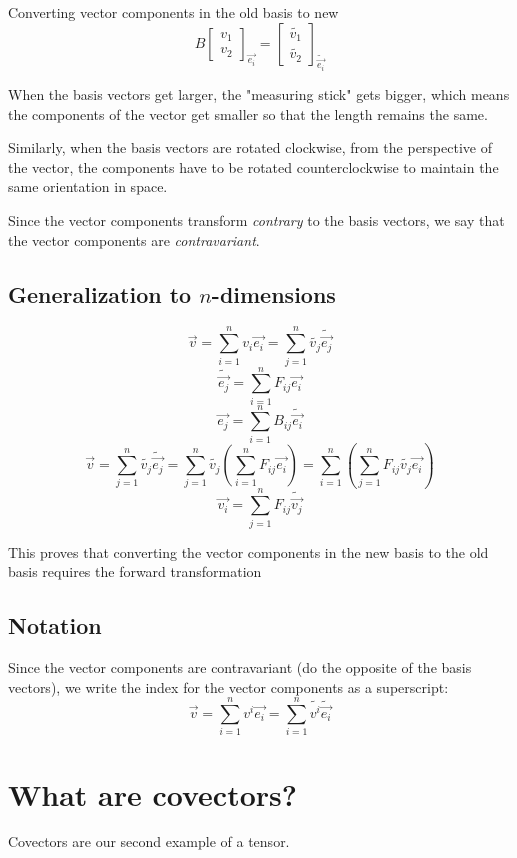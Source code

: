 \documentclass{report}
\begin{document}
Converting vector components in the old basis to new
$$ B\begin{bmatrix} v_1 \\ v_2 \end{bmatrix}_{\vec{e_i}} = \begin{bmatrix} \tilde{v_1} \\ \tilde{v_2} \end{bmatrix}_{\tilde{\vec{e_i}}}   $$ 

When the basis vectors get larger, the "measuring stick" gets bigger, which means the components of the vector get smaller so that the length remains the same.

Similarly, when the basis vectors are rotated clockwise, from the perspective of the vector, the components have to be rotated counterclockwise to maintain the same orientation in space.

Since the vector components transform \emph{contrary} to the basis vectors, we say that the vector components are \emph{contravariant}.

\section{Generalization to $n$-dimensions}
\begin{myproof}
	$$ \vec{v} = \sum_{i=1}^{n} v_i \vec{e_i} = \sum_{j=1}^{n} \tilde{v_j}\tilde{\vec{e_j}}$$
	$$ \widetilde{\vec{e_j}} = \sum_{i=1}^{n} F_{ij} \vec{e_i} $$ 
	$$ \vec{e_j} = \sum_{i=1}^{n} B_{ij} \widetilde{\vec{e_i}} $$ 
	$$ \vec{v} =  \sum_{j=1}^{n} \tilde{v_j}\tilde{\vec{e_j}} =  \sum_{j=1}^{n} \tilde{v_j} \left( \sum_{i=1}^{n} F_{ij} \vec{e_i} \right) = \sum_{i=1}^{n} \left(\sum_{j=1}^{n} F_{ij}  \widetilde{v_j}\vec{e_i}\right) $$
	$$ \vec{v_i} = \sum_{j=1}^{n} F_{ij} \widetilde{\vec{v_j}} $$ 

This proves that converting the vector components in the new basis to the old basis requires the forward transformation
\end{myproof}

\section{Notation}
Since the vector components are contravariant (do the opposite of the basis vectors), we write the index for the vector components as a superscript:
$$ \vec{v} = \sum_{i=1}^{n} v^i \vec{e_i}  = \sum_{i=1}^{n} \widetilde{v^i} \widetilde{\vec{e_i}}$$ 

\chapter{What are covectors?}
Covectors are our second example of a tensor.
\end{document}
